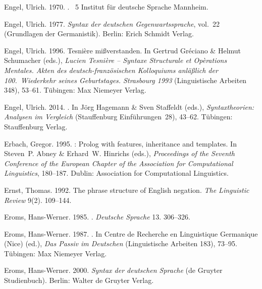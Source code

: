 \begin{thebibliography}{1420}
Engel, Ulrich. 1970.
.
~5
  Institut f{\"u}r deutsche Sprache Mannheim.

Engel, Ulrich. 1977.
\newblock \emph{{Syntax der deutschen Gegenwartssprache}}, vol.~22  (Grundlagen
  der Germanistik).
\newblock Berlin: Erich Schmidt Verlag.

Engel, Ulrich. 1996.
\newblock Tesni{\`e}re mi{\ss}verstanden.
\newblock In Gertrud Gr{\'e}ciano \& Helmut Schumacher (eds.), \emph{{Lucien
  Tesni{\`e}re -- Syntaxe Structurale et Op{\`e}rations Mentales. Akten des
  deutsch-franz{\"o}sischen Kolloquiums anl{\"a}{\ss}lich der 100.\ Wiederkehr
  seines Geburtstages. Strasbourg 1993}} (Linguistische Arbeiten 348), 53--61.
  T{\"u}bingen: Max Niemeyer Verlag.

Engel, Ulrich. 2014.
.
\newblock In J{\"o}rg Hagemann \& Sven Staffeldt (eds.), \emph{{Syntaxtheorien:
  Analysen im Vergleich}} (Stauffenburg Einf{\"u}hrungen~28), 43--62.
  T\"u\-bing\-en: Stauffenburg Verlag.

Erbach, Gregor. 1995.
: Prolog with features, inheritance and templates.
\newblock In Steven~P. Abney \& Erhard~W. Hinrichs (eds.), \emph{Proceedings of
  the {Seventh Conference of the European Chapter of the Association for
  Computational Linguistics}}, 180--187. Dublin: Association for Computational
  Linguistics.

Ernst, Thomas. 1992.
\newblock The phrase structure of {English} negation.
\newblock \emph{The Linguistic Review} 9(2). 109--144.

Eroms, Hans-Werner. 1985.
.
\newblock \emph{Deutsche Sprache} 13. 306--326.

Eroms, Hans-Werner. 1987.
.
\newblock In {Centre de Recherche en Linguistique Germanique (Nice)} (ed.),
  \emph{{Das Passiv im Deutschen}} (Linguistische Arbeiten 183), 73--95.
  T{\"u}bingen: Max Niemeyer Verlag.

Eroms, Hans-Werner. 2000.
\newblock \emph{{Syntax der deutschen Sprache}}  (de Gruyter Studienbuch).
\newblock Berlin: Walter de Gruyter Verlag.


\end{thebibliography}
